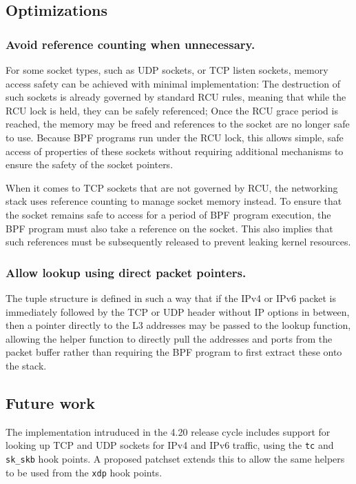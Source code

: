 \documentclass[10pt,sigconf,authorversion]{lpc}
\begin{document}
\subsection{Optimizations}

\subsubsection{Avoid reference counting when unnecessary.}

For some socket types, such as UDP sockets, or TCP listen sockets, memory
access safety can be achieved with minimal implementation: The destruction of
such sockets is already governed by standard RCU rules, meaning that while the
RCU lock is held, they can be safely referenced; Once the RCU grace period is
reached, the memory may be freed and references to the socket are no longer
safe to use. Because BPF programs run under the RCU lock, this allows simple,
safe access of properties of these sockets without requiring additional
mechanisms to ensure the safety of the socket pointers.

When it comes to TCP sockets that are not governed by RCU, the networking stack
uses reference counting to manage socket memory instead. To ensure that the
socket remains safe to access for a period of BPF program execution, the BPF
program must also take a reference on the socket. This also implies that such
references must be subsequently released to prevent leaking kernel resources.

\subsubsection{Allow lookup using direct packet pointers.}

The tuple structure is defined in such a way that if the IPv4 or IPv6 packet is
immediately followed by the TCP or UDP header without IP options in between,
then a pointer directly to the L3 addresses may be passed to the lookup
function, allowing the helper function to directly pull the addresses and ports
from the packet buffer rather than requiring the BPF program to first extract
these onto the stack.

\subsection{Future work}

The implementation intruduced in the 4.20 release cycle includes support for
looking up TCP and UDP sockets for IPv4 and IPv6 traffic, using the \verb+tc+
and \verb+sk_skb+ hook points. A proposed patchset extends this to allow the
same helpers to be used from the \verb+xdp+ hook points.
\end{document}
